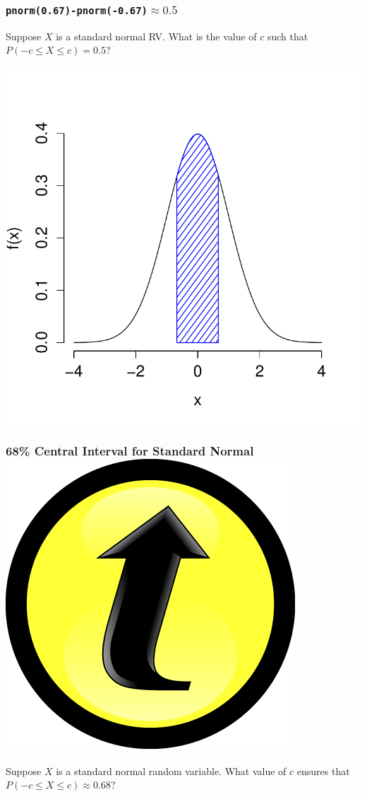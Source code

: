 \documentclass[handout]{beamer}
\begin{document}
\begin{frame}
\frametitle{\texttt{pnorm(0.67)-pnorm(-0.67)}$\approx 0.5$}
Suppose $X$ is a standard normal RV. What is the value of $c$ such that $P(-c \leq X\leq c ) = 0.5$?
\begin{center}
\includegraphics[scale = 0.55]{./images/tail5}
\end{center}
\end{frame}
\begin{frame}
\frametitle{68\% Central Interval for Standard Normal \hfill \includegraphics[scale = 0.05]{./images/clicker}}

Suppose $X$ is a standard normal random variable. What value of $c$ ensures that $P(-c \leq X \leq c) \approx 0.68$?

\end{frame}
\end{document}
